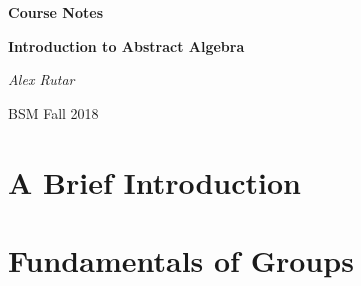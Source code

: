 \documentclass[12pt, a4paper]{book}
\theoremstyle{nonumberplain}
\newcommand{\assignmentname}{Course Notes}
\newcommand{\classname}{Introduction to Abstract Algebra}
\newcommand{\semester}{BSM Fall 2018}
\begin{document}
\begin{titlepage}
    \centering
    \vspace{5cm}
    {\huge\textbf{\assignmentname}\par} %
    \vspace{2cm}
    {\Large\textbf{\classname}\par} %
    \vspace{3cm}
    {\Large\textit{Alex Rutar}\par}

    \vfill

    {\large \semester \par} %
\end{titlepage}
{}
\tableofcontents
{}
\setcounter{chapter}{-1}
\chapter{A Brief Introduction}
\chapter{Fundamentals of Groups}
\end{document}
